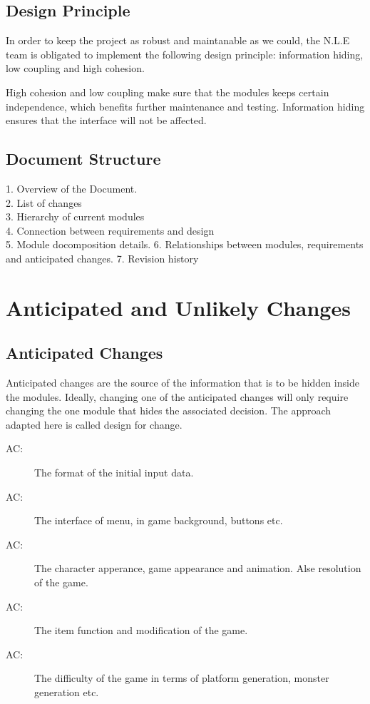 \documentclass[12pt, titlepage]{article}
\newcounter{acnum}
\newcommand{\actheacnum}{AC\theacnum}
\begin{document}
\subsection{Design Principle}
In order to keep the project as robust and maintanable as we could, the N.L.E team is obligated to implement the following design principle: information hiding, low coupling and high cohesion.

High cohesion and low coupling make sure that the modules keeps certain independence, which benefits further maintenance and testing. Information hiding ensures that the interface will not be affected.
\subsection{Document Structure}
1. Overview of the Document.\\
2. List of changes\\
3. Hierarchy of current modules\\
4. Connection between requirements and design\\
5. Module docomposition details.
6. Relationships between modules, requirements and anticipated changes.
7. Revision history

\section{Anticipated and Unlikely Changes} \label{SecChange}

\subsection{Anticipated Changes} \label{SecAchange}

Anticipated changes are the source of the information that is to be hidden
inside the modules. Ideally, changing one of the anticipated changes will only
require changing the one module that hides the associated decision. The approach
adapted here is called design for
change.

\begin{description}

\item[ \actheacnum \label{acInput}:] The format of the
  initial input data.
\item[ \actheacnum \label{acGUI}:] The interface of menu, in game background, buttons etc.
\item[ \actheacnum \label{acGraphics}:] The character apperance, game appearance and animation. Alse resolution of the game.
\item[ \actheacnum \label{acItems}:] The item function and modification of the game.
\item[ \actheacnum \label{acDifficulty}:] The difficulty of the game in terms of platform generation, monster generation etc.
\end{description}
\end{document}

